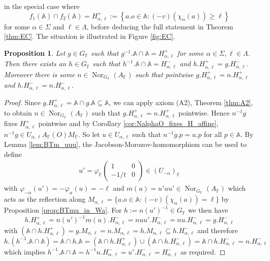\documentclass[12pt]{amsart}
\newcommand{\F}{\mathbb{F} }
\newcommand{\A}{\mathbb{A}}
\numberwithin{equation}{section}
\newtheorem{proposition}[theorem]{Proposition}
\theoremstyle{remark} %
\begin{document}
		in the special case where 
		$$
		f_1(\A)\cap f_2(\A) = H_{\alpha,\ell}^+ :=  \left\{ a.o \in \A \colon (-v)(\chi_\alpha(a)) \geq \ell \right\}
		$$
		for some $\alpha \in \Sigma$ and $\ell \in \Lambda$, before deducing the full statement in Theorem \ref{thm:EC}. The situation is illustrated in Figure \ref{fig:EC}.
		\begin{proposition}\label{prop:EC_alpha}
			Let $g \in G_\F$ such that $g^{-1}.\A \cap \A = H_{\alpha, \ell}^+$ for some $\alpha \in \Sigma, \ell \in \Lambda$. Then there exists an $h\in G_\F$ such that $h^{-1}.\A \cap \A = H_{\alpha,\ell}^-$ and $ h.H_{\alpha,\ell}^+ = g.H_{\alpha,\ell}^-$. Moreover there is some $n\in \operatorname{Nor}_{G_\F}(A_\F)$ such that pointwise $g.H_{\alpha,\ell}^+ = n.H_{\alpha,\ell}^+$ and $h.H_{\alpha,\ell}^- = n.H_{\alpha,\ell}^-$.
		\end{proposition}
		\begin{proof}
			Since $g.H_{\alpha,\ell}^+ = \A \cap g.\A \subseteq \A$, we can apply axiom (A2), Theorem \ref{thm:A2}, to obtain $n \in \operatorname{Nor}_{G_\F}(A_\F)$ such that $g.H_{\alpha,\ell}^+ = n.H_{\alpha,\ell}^+$ pointwise. Hence $n^{-1}g$ fixes $H_{\alpha,\ell}^+$ pointwise and by Corollary \ref{cor:NalphaO_fixes_H_affine}, $n^{-1}g \in U_{\alpha, \ell} A_\F(O) M_\F$. So let $u \in U_{\alpha, \ell}$ such that $n^{-1}g.p = u.p$ for all $p \in \A$. By Lemma \ref{lem:BTm_uuu}, the Jacobson-Morozov-homomorphism can be used to define
			\begin{align*}
				u' = \varphi_\F \begin{pmatrix}
					1 & 0 \\ - 1/t & 0
				\end{pmatrix} \in (U_{-\alpha})_\F
			\end{align*}
			with $\varphi_{-\alpha} (u') = -\varphi_\alpha(u) = -\ell$ and $m(u) = u'uu' \in \operatorname{Nor}_{G_\F}(A_\F)$ which acts as the reflection along $M_{\alpha, \ell} = \{ a.o \in \A \colon (-v)(\chi_\alpha(a)) = \ell \}$ by Proposition \ref{prop:BTmu_in_Wa}. For $h := n(u')^{-1} \in G_\F$ we then have
			$$
			h.H_{\alpha,\ell}^+ = n (u')^{-1} m(u) .H_{\alpha,\ell}^- = n u u' .H_{\alpha,\ell}^- = nu.H_{\alpha,\ell}^- = g.H_{\alpha,\ell}^-
			$$
			with $(\A \cap h.H_{\alpha,\ell}^+) = g.M_{\alpha,\ell} = n.M_{\alpha,\ell} = h.M_{\alpha,\ell} \subseteq h.H_{\alpha,\ell}^-$ and therefore 
			$$
			h.(h^{-1}.\A\cap \A) = \A \cap h.\A = (\A \cap h.H_{\alpha,\ell}^+ )\cup(\A \cap h.H_{\alpha,\ell}^-) = \A \cap h.H_{\alpha,\ell}^- = n.H_{\alpha,\ell}^-
			$$
			which implies $h^{-1}.\A \cap \A = h^{-1}n.H_{\alpha,\ell}^- = u'.H_{\alpha,\ell}^- = H_{\alpha,\ell}^- $ as required.
		\end{proof}
		
\end{document}
